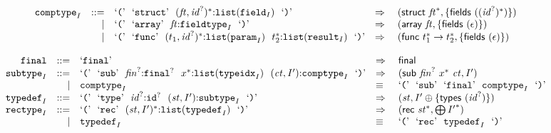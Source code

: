 $$\begin{array}[t]{@{}lrrl@{}l@{}l@{}l@{}}
& {{\mathtt{comptype}}}_{I} & ::= & \mbox{‘\texttt{{(}}’}~~\mbox{‘\texttt{struct}’}~~{({\mathit{ft}}, {{\mathit{id}}^?})^\ast}{:}{\mathtt{list}}({{\mathtt{field}}}_{I})~~\mbox{‘\texttt{{)}}’} & \quad\Rightarrow\quad{} & (\mathsf{struct}~{{\mathit{ft}}^\ast}, \{ \mathsf{fields}~({({{\mathit{id}}^?})^\ast}) \}) \\
& & | & \mbox{‘\texttt{{(}}’}~~\mbox{‘\texttt{array}’}~~{\mathit{ft}}{:}{{\mathtt{fieldtype}}}_{I}~~\mbox{‘\texttt{{)}}’} & \quad\Rightarrow\quad{} & (\mathsf{array}~{\mathit{ft}}, \{ \mathsf{fields}~(\epsilon) \}) \\
& & | & \mbox{‘\texttt{{(}}’}~~\mbox{‘\texttt{func}’}~~{(t_1, {{\mathit{id}}^?})^\ast}{:}{\mathtt{list}}({{\mathtt{param}}}_{I})~~{t_2^\ast}{:}{\mathtt{list}}({{\mathtt{result}}}_{I})~~\mbox{‘\texttt{{)}}’} & \quad\Rightarrow\quad{} & (\mathsf{func}~{t_1^\ast} \rightarrow {t_2^\ast}, \{ \mathsf{fields}~(\epsilon) \}) \\
\end{array}
$$

\vspace{1ex}

$$
\begin{array}[t]{@{}lrrl@{}l@{}l@{}l@{}}
& {\mathtt{final}} & ::= & \mbox{‘\texttt{final}’} & \quad\Rightarrow\quad{} & \mathsf{final} \\
& {{\mathtt{subtype}}}_{I} & ::= & \mbox{‘\texttt{{(}}’}~~\mbox{‘\texttt{sub}’}~~{{\mathit{fin}}^?}{:}{{\mathtt{final}}^?}~~{x^\ast}{:}{\mathtt{list}}({{\mathtt{typeidx}}}_{I})~~({\mathit{ct}}, {I'}){:}{{\mathtt{comptype}}}_{I}~~\mbox{‘\texttt{{)}}’} & \quad\Rightarrow\quad{} & (\mathsf{sub}~{{\mathit{fin}}^?}~{x^\ast}~{\mathit{ct}}, {I'}) \\
& & | & {{\mathtt{comptype}}}_{I} & \quad\equiv\quad{} & \mbox{‘\texttt{{(}}’}~~\mbox{‘\texttt{sub}’}~~\mbox{‘\texttt{final}’}~~{{\mathtt{comptype}}}_{I}~~\mbox{‘\texttt{{)}}’} \\
& {{\mathtt{typedef}}}_{I} & ::= & \mbox{‘\texttt{{(}}’}~~\mbox{‘\texttt{type}’}~~{{\mathit{id}}^?}{:}{{\mathtt{id}}^?}~~({\mathit{st}}, {I'}){:}{{\mathtt{subtype}}}_{I}~~\mbox{‘\texttt{{)}}’} & \quad\Rightarrow\quad{} & ({\mathit{st}}, {I'} \oplus \{ \mathsf{types}~({{\mathit{id}}^?}) \}) \\
& {{\mathtt{rectype}}}_{I} & ::= & \mbox{‘\texttt{{(}}’}~~\mbox{‘\texttt{rec}’}~~{({\mathit{st}}, {I'})^\ast}{:}{\mathtt{list}}({{\mathtt{typedef}}}_{I})~~\mbox{‘\texttt{{)}}’} & \quad\Rightarrow\quad{} & (\mathsf{rec}~{{\mathit{st}}^\ast}, {\bigoplus}\, {{I'}^\ast}) \\
& & | & {{\mathtt{typedef}}}_{I} & \quad\equiv\quad{} & \mbox{‘\texttt{{(}}’}~~\mbox{‘\texttt{rec}’}~~{{\mathtt{typedef}}}_{I}~~\mbox{‘\texttt{{)}}’} \\
\end{array}
$$

